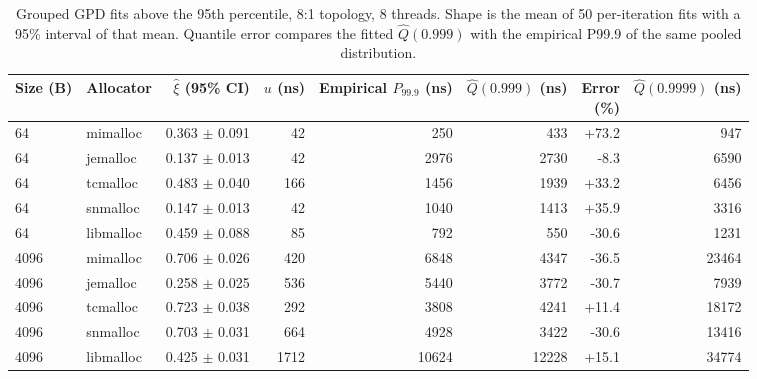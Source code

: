 \begin{table}[!htbp]
\centering
\scriptsize
\setlength{\tabcolsep}{3pt}
\caption{Grouped GPD fits above the 95th percentile, 8:1 topology, 8 threads. Shape is the mean of 50 per-iteration fits with a 95\% interval of that mean. Quantile error compares the fitted $\hat{Q}(0.999)$ with the empirical P99.9 of the same pooled distribution.}
\label{tab:gpd}
\begin{tabular}{llrrrrrr}
\toprule
Size (B) & Allocator & \shortstack{$\hat{\xi}$\\(95\% CI)} & \shortstack{$u$\\(ns)} & \shortstack{Empirical\\$P_{99.9}$ (ns)} & \shortstack{$\hat{Q}(0.999)$\\(ns)} & \shortstack{Error\\(\%)} & \shortstack{$\hat{Q}(0.9999)$\\(ns)}\\
\midrule
64 & mimalloc & 0.363 $\pm$ 0.091 & 42 & 250 & 433 & +73.2 & 947 \\
64 & jemalloc & 0.137 $\pm$ 0.013 & 42 & 2976 & 2730 & -8.3 & 6590 \\
64 & tcmalloc & 0.483 $\pm$ 0.040 & 166 & 1456 & 1939 & +33.2 & 6456 \\
64 & snmalloc & 0.147 $\pm$ 0.013 & 42 & 1040 & 1413 & +35.9 & 3316 \\
64 & libmalloc & 0.459 $\pm$ 0.088 & 85 & 792 & 550 & -30.6 & 1231 \\
4096 & mimalloc & 0.706 $\pm$ 0.026 & 420 & 6848 & 4347 & -36.5 & 23464 \\
4096 & jemalloc & 0.258 $\pm$ 0.025 & 536 & 5440 & 3772 & -30.7 & 7939 \\
4096 & tcmalloc & 0.723 $\pm$ 0.038 & 292 & 3808 & 4241 & +11.4 & 18172 \\
4096 & snmalloc & 0.703 $\pm$ 0.031 & 664 & 4928 & 3422 & -30.6 & 13416 \\
4096 & libmalloc & 0.425 $\pm$ 0.031 & 1712 & 10624 & 12228 & +15.1 & 34774 \\
\bottomrule
\end{tabular}
\end{table}
